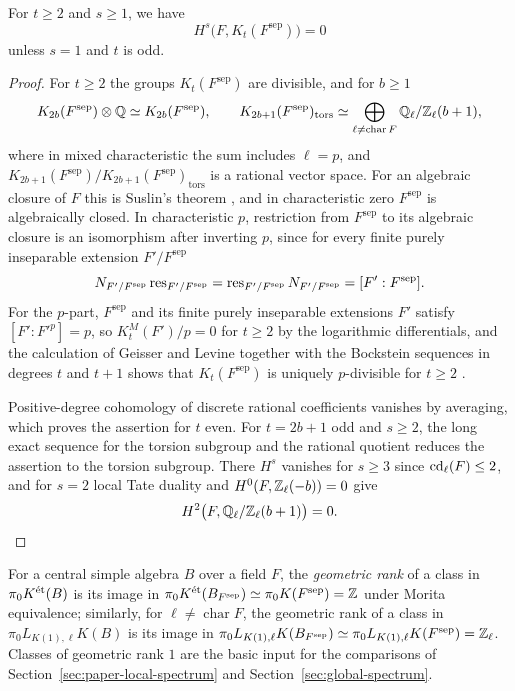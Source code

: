 \begin{lemma}\label{lem:paper-local-galois-vanishing}
For $t\ge2$ and $s\ge1$, we have
\[
 H^s\bigl(F,K_t(F^{\mathrm{sep}})\bigr)=0
\]
unless $s=1$ and $t$ is odd.
\end{lemma}
\begin{proof}
For $t\ge2$ the groups $K_t(F^{\mathrm{sep}})$ are divisible, and for $b\ge1$
\[
 K_{2b}(F^{\mathrm{sep}})\otimes\mathbb Q\simeq K_{2b}(F^{\mathrm{sep}}),\qquad
 K_{2b+1}(F^{\mathrm{sep}})_{\mathrm{tors}}\simeq\bigoplus_{\ell\ne\operatorname{char}F}\mathbb Q_\ell/\mathbb Z_\ell(b+1),
\]
where in mixed characteristic the sum includes $\ell=p$, and $K_{2b+1}(F^{\mathrm{sep}})/K_{2b+1}(F^{\mathrm{sep}})_{\mathrm{tors}}$ is a rational vector space.
For an algebraic closure of $F$ this is Suslin's theorem \cite{SuslinClosed}, and in characteristic zero $F^{\mathrm{sep}}$ is algebraically closed.
In characteristic $p$, restriction from $F^{\mathrm{sep}}$ to its algebraic closure is an isomorphism after inverting $p$, since for every finite purely inseparable extension $F'/F^{\mathrm{sep}}$
\[
 N_{F'/F^{\mathrm{sep}}}\operatorname{res}_{F'/F^{\mathrm{sep}}}=\operatorname{res}_{F'/F^{\mathrm{sep}}}N_{F'/F^{\mathrm{sep}}}=[F':F^{\mathrm{sep}}].
\]
For the $p$-part, $F^{\mathrm{sep}}$ and its finite purely inseparable extensions $F'$ satisfy $[F':F'^p]=p$, so $K_t^M(F')/p=0$ for $t\ge2$ by the logarithmic differentials, and the calculation of Geisser and Levine together with the Bockstein sequences in degrees $t$ and $t+1$ shows that $K_t(F^{\mathrm{sep}})$ is uniquely $p$-divisible for $t\ge2$ \cite{GeisserLevine}.

Positive-degree cohomology of discrete rational coefficients vanishes by averaging, which proves the assertion for $t$ even.
For $t=2b+1$ odd and $s\ge2$, the long exact sequence for the torsion subgroup and the rational quotient reduces the assertion to the torsion subgroup.
There $H^s$ vanishes for $s\ge3$ since $\operatorname{cd}_\ell(F)\le2$, and for $s=2$ local Tate duality \cite{TateDuality} and $H^0(F,\mathbb Z_\ell(-b))=0$ give
\[
 H^2\bigl(F,\mathbb Q_\ell/\mathbb Z_\ell(b+1)\bigr)=0.
\]
\end{proof}


For a central simple algebra $B$ over a field $F$, the \emph{geometric rank} of a class in $\pi_0K^{\mathrm{\acute et}}(B)$ is its image in $\pi_0K^{\mathrm{\acute et}}(B_{F^{\mathrm{sep}}})\simeq\pi_0K(F^{\mathrm{sep}})=\mathbb Z$ under Morita equivalence; similarly, for $\ell\ne\operatorname{char}F$, the geometric rank of a class in $\pi_0L_{K(1),\ell}K(B)$ is its image in $\pi_0L_{K(1),\ell}K(B_{F^{\mathrm{sep}}})\simeq\pi_0L_{K(1),\ell}K(F^{\mathrm{sep}})=\mathbb Z_\ell$.
Classes of geometric rank $1$ are the basic input for the comparisons of Section~\ref{sec:paper-local-spectrum} and Section~\ref{sec:global-spectrum}.

